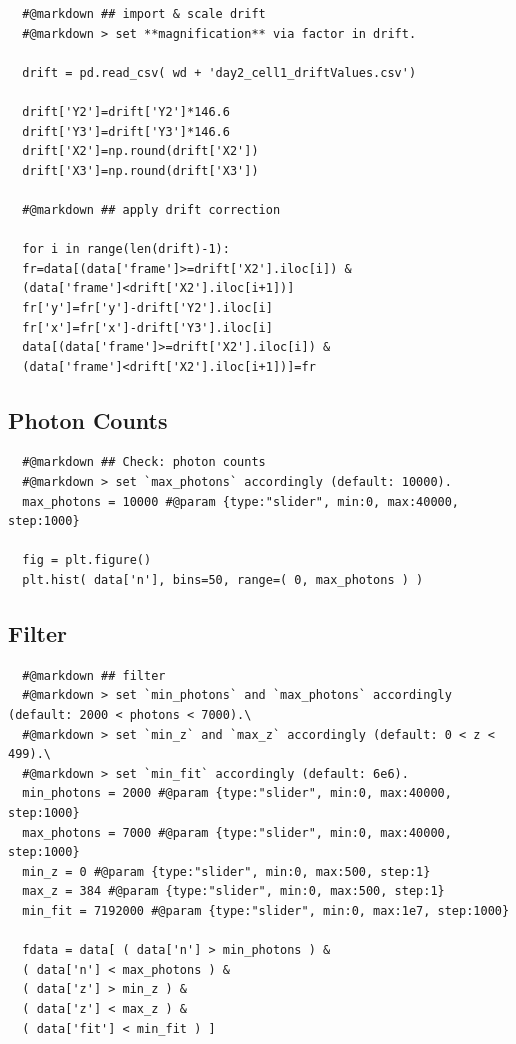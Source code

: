 \documentclass[11pt, a4paper, oneside, twocolumn]{report}
\begin{document}
\begin{verbatim}
  #@markdown ## import & scale drift
  #@markdown > set **magnification** via factor in drift.

  drift = pd.read_csv( wd + 'day2_cell1_driftValues.csv')

  drift['Y2']=drift['Y2']*146.6
  drift['Y3']=drift['Y3']*146.6
  drift['X2']=np.round(drift['X2'])
  drift['X3']=np.round(drift['X3'])

  #@markdown ## apply drift correction

  for i in range(len(drift)-1):
  fr=data[(data['frame']>=drift['X2'].iloc[i]) &
  (data['frame']<drift['X2'].iloc[i+1])]
  fr['y']=fr['y']-drift['Y2'].iloc[i]
  fr['x']=fr['x']-drift['Y3'].iloc[i]
  data[(data['frame']>=drift['X2'].iloc[i]) &
  (data['frame']<drift['X2'].iloc[i+1])]=fr
\end{verbatim}


\subsection{Photon Counts}

\begin{verbatim}
  #@markdown ## Check: photon counts
  #@markdown > set `max_photons` accordingly (default: 10000).
  max_photons = 10000 #@param {type:"slider", min:0, max:40000, step:1000}
  
  fig = plt.figure()
  plt.hist( data['n'], bins=50, range=( 0, max_photons ) )
\end{verbatim}


\subsection{Filter}

\begin{verbatim}
  #@markdown ## filter
  #@markdown > set `min_photons` and `max_photons` accordingly (default: 2000 < photons < 7000).\
  #@markdown > set `min_z` and `max_z` accordingly (default: 0 < z < 499).\
  #@markdown > set `min_fit` accordingly (default: 6e6).
  min_photons = 2000 #@param {type:"slider", min:0, max:40000, step:1000}
  max_photons = 7000 #@param {type:"slider", min:0, max:40000, step:1000}
  min_z = 0 #@param {type:"slider", min:0, max:500, step:1}
  max_z = 384 #@param {type:"slider", min:0, max:500, step:1}
  min_fit = 7192000 #@param {type:"slider", min:0, max:1e7, step:1000}
  
  fdata = data[ ( data['n'] > min_photons ) &
  ( data['n'] < max_photons ) & 
  ( data['z'] > min_z ) &
  ( data['z'] < max_z ) &
  ( data['fit'] < min_fit ) ]
\end{verbatim}
\end{document}
